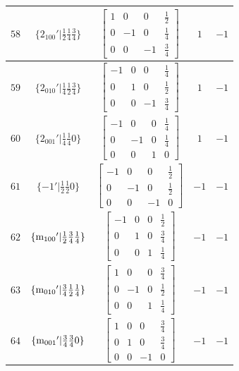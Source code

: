 \documentclass[fleqn,8pt]{jsarticle}
\begin{document}
\begin{longtable}{ccccc}
$ 58 $ & $ \{2{}_{100}{}'|\frac{1}{2} \frac{1}{4} \frac{3}{4}\} $ & $ \begin{bmatrix} 1 & 0 & 0 & \frac{1}{2} \\ 0 & -1 & 0 & \frac{1}{4} \\ 0 & 0 & -1 & \frac{3}{4} \end{bmatrix} $ & $ 1 $ & $ -1 $ \\ \hline
$ 59 $ & $ \{2{}_{010}{}'|\frac{1}{4} \frac{1}{2} \frac{3}{4}\} $ & $ \begin{bmatrix} -1 & 0 & 0 & \frac{1}{4} \\ 0 & 1 & 0 & \frac{1}{2} \\ 0 & 0 & -1 & \frac{3}{4} \end{bmatrix} $ & $ 1 $ & $ -1 $ \\ \hline
$ 60 $ & $ \{2{}_{001}{}'|\frac{1}{4} \frac{1}{4} 0\} $ & $ \begin{bmatrix} -1 & 0 & 0 & \frac{1}{4} \\ 0 & -1 & 0 & \frac{1}{4} \\ 0 & 0 & 1 & 0 \end{bmatrix} $ & $ 1 $ & $ -1 $ \\ \hline
$ 61 $ & $ \{-1{}'|\frac{1}{2} \frac{1}{2} 0\} $ & $ \begin{bmatrix} -1 & 0 & 0 & \frac{1}{2} \\ 0 & -1 & 0 & \frac{1}{2} \\ 0 & 0 & -1 & 0 \end{bmatrix} $ & $ -1 $ & $ -1 $ \\ \hline
$ 62 $ & $ \{{\rm m}_{100}{}'|\frac{1}{2} \frac{3}{4} \frac{1}{4}\} $ & $ \begin{bmatrix} -1 & 0 & 0 & \frac{1}{2} \\ 0 & 1 & 0 & \frac{3}{4} \\ 0 & 0 & 1 & \frac{1}{4} \end{bmatrix} $ & $ -1 $ & $ -1 $ \\ \hline
$ 63 $ & $ \{{\rm m}_{010}{}'|\frac{3}{4} \frac{1}{2} \frac{1}{4}\} $ & $ \begin{bmatrix} 1 & 0 & 0 & \frac{3}{4} \\ 0 & -1 & 0 & \frac{1}{2} \\ 0 & 0 & 1 & \frac{1}{4} \end{bmatrix} $ & $ -1 $ & $ -1 $ \\ \hline
$ 64 $ & $ \{{\rm m}_{001}{}'|\frac{3}{4} \frac{3}{4} 0\} $ & $ \begin{bmatrix} 1 & 0 & 0 & \frac{3}{4} \\ 0 & 1 & 0 & \frac{3}{4} \\ 0 & 0 & -1 & 0 \end{bmatrix} $ & $ -1 $ & $ -1 $ \\
\end{longtable}
\end{document}
